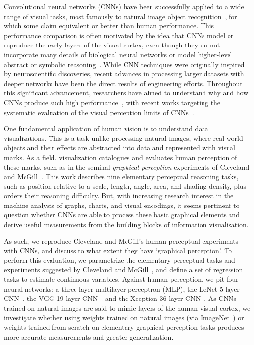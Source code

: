 
\maketitle

Convolutional neural networks (CNNs) have been successfully applied to a wide range of visual tasks, most famously to natural image object recognition~\cite{krizhevsky_imagenet2012, simonyan_very_deep2014, szegedy2015}, for which some claim equivalent or better than human performance. This performance comparison is often motivated by the idea that CNNs model or reproduce the early layers of the visual cortex, even though they do not incorporate many details of biological neural networks or model higher-level abstract or symbolic reasoning~\cite{yamins2016using, hassabis2017neuroscience, human_vs_machine_vision}. While CNN techniques were originally inspired by neuroscientific discoveries, recent advances in processing larger datasets with deeper networks have been the direct results of engineering efforts. Throughout this significant advancement, researchers have aimed to understand why and how CNNs produce such high performance~\cite{goodfellow_book, deeplearning_blackbox2017}, with recent works targeting the systematic evaluation of the visual perception limits of CNNs~\cite{clevr, not_so_clevr}.

One fundamental application of human vision is to understand data visualizations. This is a task unlike processing natural images, where real-world objects and their effects are abstracted into data and represented with visual marks. As a field, visualization catalogues and evaluates human perception of these marks, such as in the seminal \emph{graphical perception} experiments of Cleveland and McGill~\cite{cleveland_mcgill}. This work describes nine elementary perceptual reasoning tasks, such as position relative to a scale, length, angle, area, and shading density, plus orders their reasoning difficulty. But, with increasing research interest in the machine analysis of graphs, charts, and visual encodings, it seems pertinent to question whether CNNs are able to process these basic graphical elements and derive useful measurements from the building blocks of information visualization.

As such, we reproduce Cleveland and McGill's human perceptual experiments with CNNs, and discuss to what extent they have `graphical perception'. To perform this evaluation, we parametrize the elementary perceptual tasks and experiments suggested by Cleveland and McGill~\cite{cleveland_mcgill}, and define a set of regression tasks to estimate continuous variables. Against human perception, we pit four neural networks: a three-layer multilayer perceptron (MLP), the LeNet 5-layer CNN~\cite{lenet}, the VGG 19-layer CNN~\cite{simonyan_very_deep2014}, and the Xception 36-layer CNN~\cite{xception}. As CNNs trained on natural images are said to mimic layers of the human visual cortex, we investigate whether using weights trained on natural images (via ImageNet~\cite{imagenet}) or weights trained from scratch on elementary graphical perception tasks produces more accurate measurements and greater generalization.

